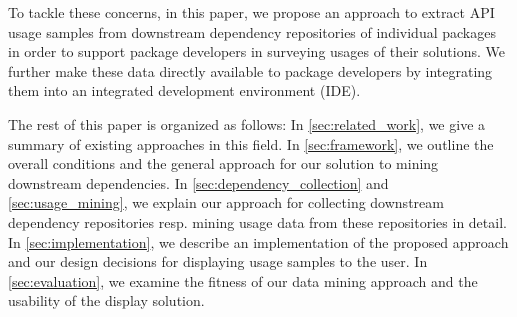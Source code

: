 To tackle these concerns, in this paper, we propose an approach to extract API usage samples from downstream dependency repositories of individual packages in order to support package developers in surveying usages of their solutions.
We further make these data directly available to package developers by integrating them into an integrated development environment (IDE).

The rest of this paper is organized as follows:
In \cref{sec:related_work}, we give a summary of existing approaches in this field.
In \cref{sec:framework}, we outline the overall conditions and the general approach for our solution to mining downstream dependencies.
In \cref{sec:dependency_collection} and \cref{sec:usage_mining}, we explain our approach for collecting downstream dependency repositories resp. mining usage data from these repositories in detail.
In \cref{sec:implementation}, we describe an implementation of the proposed approach and our design decisions for displaying usage samples to the user.
In \cref{sec:evaluation}, we examine the fitness of our data mining approach and the usability of the display solution.
